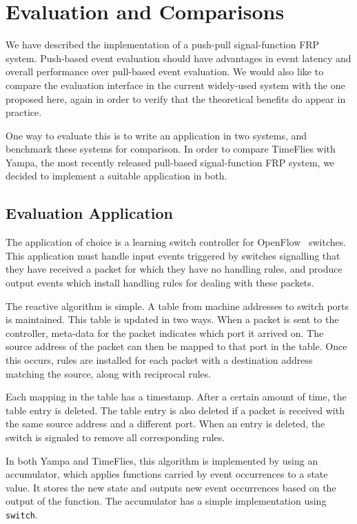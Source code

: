 \chapter{Evaluation and Comparisons}
\label{chapter:Evaluation_and_Comparisons}

We have described the implementation of a push-pull signal-function FRP system.
Push-based event evaluation should have advantages in event latency and overall
performance over pull-based event evaluation. We would also like to compare
the evaluation interface in the current widely-used system with the one proposed
here, again in order to verify that the theoretical benefits do appear in
practice.

One way to evaluate this is to write an application in two systems, and benchmark
these systems for comparison. In order to compare TimeFlies with Yampa, the most
recently released pull-based signal-function FRP system, we decided to implement
a suitable application in both.

\section{Evaluation Application}
\label{section:Evaluation_and_Comparisons-Evaluation_Application}

The application of choice is a learning switch controller for OpenFlow~\cite{OpenflowSpec}
switches. This application must handle input events triggered by switches
signalling that they have received a packet for which they have no handling
rules, and produce output events which install handling rules for dealing with
these packets.

The reactive algorithm is simple. A table from machine addresses to switch ports
is maintained. This table is updated in two ways. When a packet is sent to the
controller, meta-data for the packet indicates which port it arrived on. The
source address of the packet can then be mapped to that port in the table.
Once this occurs, rules are installed for each packet with a destination address
matching the source, along with reciprocal rules.

Each mapping in the table has a timestamp. After a certain amount of time, the
table entry is deleted. The table entry is also deleted if a packet is received
with the same source address and a different port. When an entry is deleted,
the switch is signaled to remove all corresponding rules.

In both Yampa and TimeFlies, this algorithm is implemented by using an accumulator,
which applies functions carried by event occurrences to a state value. It stores
the new state and outputs new event occurrences based on the output of the function.
The accumulator has a simple implementation using {\tt switch}.


